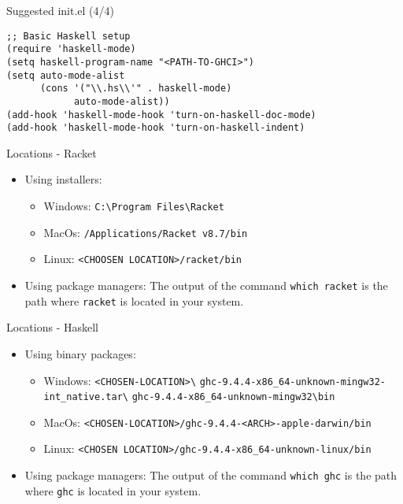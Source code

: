 \begin{frame}[fragile]{Suggested init.el (4/4)}
 \begin{verbatim}
;; Basic Haskell setup
(require 'haskell-mode)
(setq haskell-program-name "<PATH-TO-GHCI>")
(setq auto-mode-alist
      (cons '("\\.hs\\'" . haskell-mode)
            auto-mode-alist))
(add-hook 'haskell-mode-hook 'turn-on-haskell-doc-mode)
(add-hook 'haskell-mode-hook 'turn-on-haskell-indent)
\end{verbatim} 
\end{frame}

\begin{frame}[fragile]{Locations - Racket}
  \begin{itemize}
  \item Using installers:
    \begin{itemize}
    \item Windows: \verb|C:\Program Files\Racket|
    \item MacOs: \verb|/Applications/Racket v8.7/bin|
    \item Linux: \verb|<CHOOSEN LOCATION>/racket/bin|
    \end{itemize}
  \item Using package managers:
    The output of the command \verb|which racket| is the path where
    \verb|racket| is located in your system.

  \end{itemize}
\end{frame}

\begin{frame}[fragile]{Locations - Haskell}
  \begin{itemize}
  \item Using binary packages:
    \begin{itemize}
    \item Windows:
      \verb|<CHOSEN-LOCATION>\|
      \verb|ghc-9.4.4-x86_64-unknown-mingw32-int_native.tar\|
      \verb|ghc-9.4.4-x86_64-unknown-mingw32\bin|
    \item MacOs: \verb|<CHOSEN-LOCATION>/ghc-9.4.4-<ARCH>-apple-darwin/bin|
    \item Linux: \verb|<CHOSEN LOCATION>/ghc-9.4.4-x86_64-unknown-linux/bin|
    \end{itemize}
  \item Using package managers:
    The output of the command \verb|which ghc| is the path where
    \verb|ghc| is located in your system.
  \end{itemize}
\end{frame}
